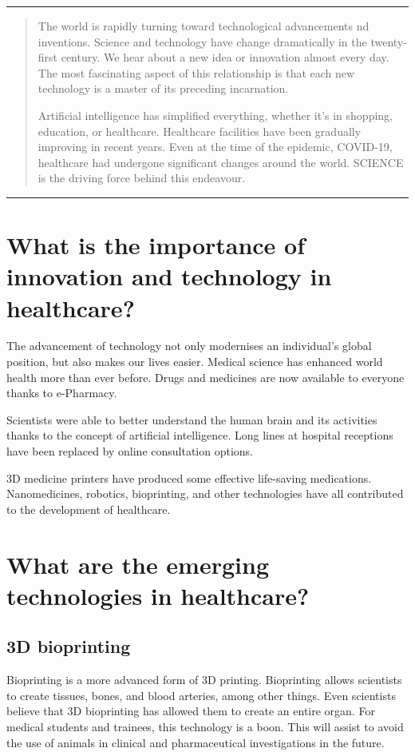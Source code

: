 \documentclass[15pt]{article}
\begin{document}
\pagestyle{fancy}
\tableofcontents
\empty

\rule{\textwidth}{0.5pt}
\begin{abstract}
    The world is rapidly turning toward technological advancements 
    nd inventions. Science and technology have change dramatically 
    in the twenty-first century. We hear about a new idea or 
    innovation almost every day. The most fascinating aspect of this 
    relationship is that each new technology is a master of its 
    preceding incarnation.
    
    Artificial intelligence has simplified everything, whether it's 
    in shopping, education, or healthcare. Healthcare facilities have
    been gradually improving in recent years. Even at the time of the
    epidemic, COVID-19, healthcare had undergone significant changes 
    around the world. SCIENCE is the driving force behind this 
    endeavour.
\end{abstract}
\rule{\textwidth}{0.5pt}

\section{What is the importance of innovation and technology in healthcare?}
The advancement of technology not only modernises an individual's 
global position, but also makes our lives easier. Medical science has
enhanced world health more than ever before. Drugs and medicines are 
now available to everyone thanks to e-Pharmacy.

Scientists were able to better understand the human brain and its 
activities thanks to the concept of artificial intelligence. Long 
lines at hospital receptions have been replaced by online 
consultation options.

3D medicine printers have produced some effective life-saving 
medications. Nanomedicines, robotics, bioprinting, and other 
technologies have all contributed to the development of healthcare.

\section{What are the emerging technologies in healthcare?}

\subsection{3D bioprinting}
Bioprinting is a more advanced form of 3D printing. Bioprinting 
allows scientists to create tissues, bones, and blood arteries, among
other things. Even scientists believe that 3D bioprinting has allowed them to create an entire organ.
For medical students and trainees, this technology is a boon. This 
will assist to avoid the use of animals in clinical and 
pharmaceutical investigations in the future.
\end{document}

